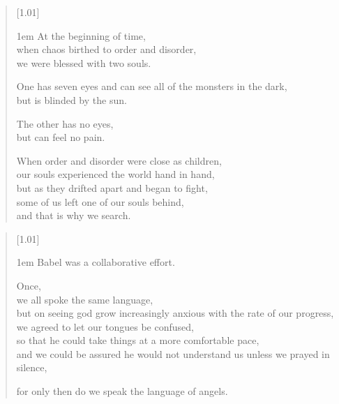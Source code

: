 \null
\vfill
\begin{verse}[1.01\textwidth]
    {\vgap1em
    At the beginning of time,\\
    \vin \vin when chaos birthed to order and disorder,\\
    we were blessed with two souls.

    One has seven eyes and can see all of the monsters in the dark,\\
    \vin \vin but is blinded by the sun.

    The other has no eyes,\\
    \vin \vin but can feel no pain.

    When order and disorder were close as children,\\
    \vin our souls experienced the world hand in hand,\\
    \vin \vin but as they drifted apart and began to fight,\\
    \vin \vin \vin some of us left one of our souls behind,\\
    \vin \vin \vin \vin and that is why we search.
    }
\end{verse}
\vfill
\newpage

\null
\vfill
\begin{verse}[1.01\textwidth]
    {\vgap1em
    Babel was a collaborative effort.

    Once,\\
    we all spoke the same language,\\
    \vin but on seeing god grow increasingly anxious with the rate of our progress,\\
    \vin \vin we agreed to let our tongues be confused,\\
    \vin \vin \vin so that he could take things at a more comfortable pace,\\
    \vin \vin \vin \vin and we could be assured he would not understand us \mbox{unless} we prayed in silence,

    for only then do we speak the language of angels.}
\end{verse}
\vfill
\newpage

